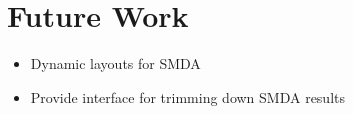 \section{Future Work}
\label{sect:maw_future_work}

\begin{itemize}

    \item Dynamic layouts for SMDA

    \item Provide interface for trimming down SMDA results

\end{itemize}
